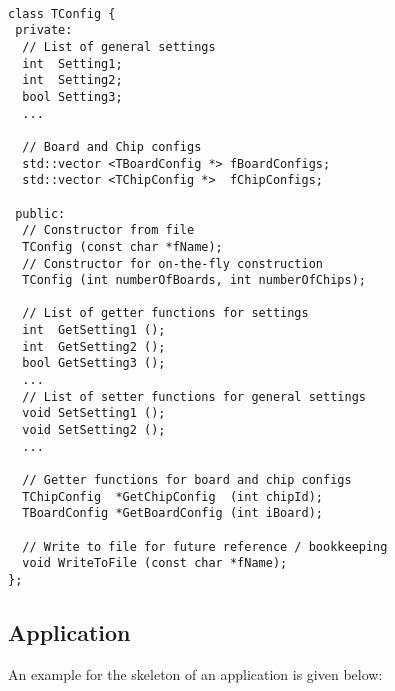 \documentclass{article}
\begin{document}
\begin{verbatim}

class TConfig {
 private: 
  // List of general settings
  int  Setting1;
  int  Setting2;
  bool Setting3;
  ...

  // Board and Chip configs
  std::vector <TBoardConfig *> fBoardConfigs;
  std::vector <TChipConfig *>  fChipConfigs;

 public:
  // Constructor from file
  TConfig (const char *fName);
  // Constructor for on-the-fly construction
  TConfig (int numberOfBoards, int numberOfChips);

  // List of getter functions for settings
  int  GetSetting1 ();
  int  GetSetting2 (); 
  bool GetSetting3 ();
  ... 
  // List of setter functions for general settings
  void SetSetting1 ();
  void SetSetting2 ();
  ...

  // Getter functions for board and chip configs
  TChipConfig  *GetChipConfig  (int chipId);
  TBoardConfig *GetBoardConfig (int iBoard);

  // Write to file for future reference / bookkeeping 
  void WriteToFile (const char *fName);
};

\end{verbatim}



\subsection{Application} 

An example for the skeleton of an application is given below: 
\end{document}
